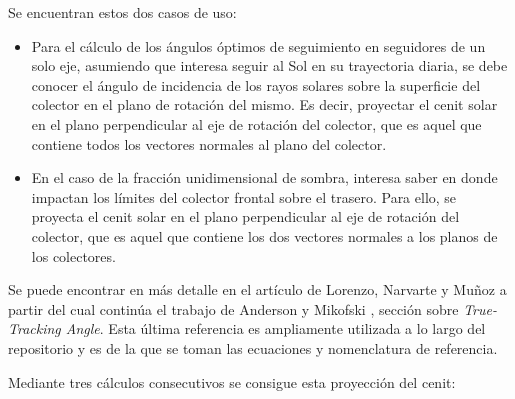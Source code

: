 Se encuentran estos dos casos de uso:

\begin{itemize}
    \item Para el cálculo de los \gls{ángulos óptimos de seguimiento} en seguidores de un solo eje, asumiendo que interesa seguir al Sol en su trayectoria diaria, se debe conocer el ángulo de incidencia de los rayos solares sobre la superficie del colector en el plano de rotación del mismo. Es decir, proyectar el cenit solar en el plano perpendicular al eje de rotación del colector, que es aquel que contiene todos los vectores normales al plano del colector.
    \item En el caso de la fracción unidimensional de \gls{sombra}, interesa saber en donde impactan los límites del colector frontal sobre el trasero. Para ello, se proyecta el cenit solar en el plano perpendicular al eje de rotación del colector, que es aquel que contiene los dos vectores normales a los planos de los \gls{colectores}.
\end{itemize}

Se puede encontrar en más detalle en el artículo de Lorenzo, Narvarte y Muñoz \cite{Lorenzo_Narvarte_Muñoz_2011} a partir del cual continúa el trabajo de Anderson y Mikofski \cite{Anderson_Mikofski_2020}, sección sobre \textit{True-Tracking Angle}. Esta última referencia es ampliamente utilizada a lo largo del repositorio y es de la que se toman las ecuaciones y nomenclatura de referencia.

Mediante tres cálculos consecutivos se consigue esta proyección del cenit:

